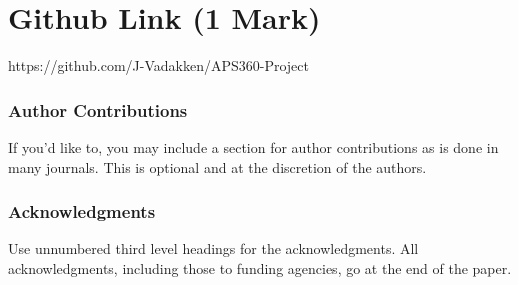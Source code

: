 \documentclass{article} %
\begin{document}
\section{Github Link (1 Mark)}
https://github.com/J-Vadakken/APS360-Project



\subsubsection*{Author Contributions}
If you'd like to, you may include  a section for author contributions as is done
in many journals. This is optional and at the discretion of the authors.

\subsubsection*{Acknowledgments}
Use unnumbered third level headings for the acknowledgments. All
acknowledgments, including those to funding agencies, go at the end of the paper.

\label{last_page}



\end{document}
